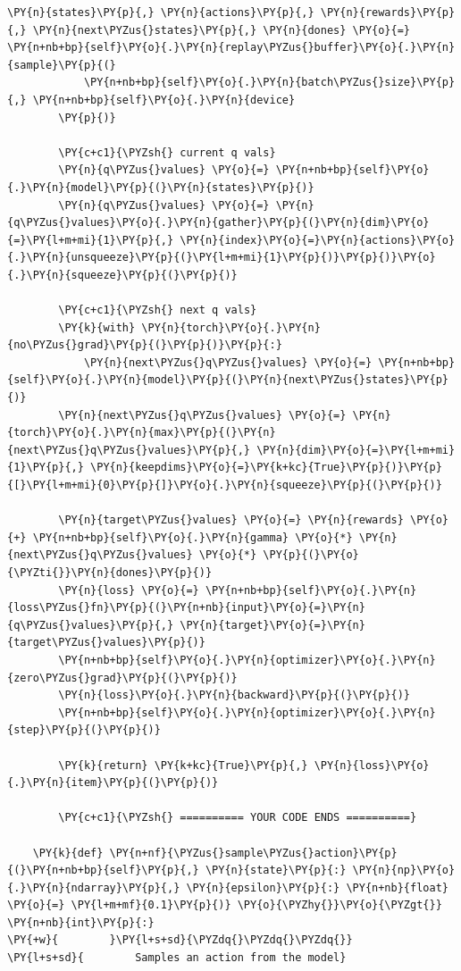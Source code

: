 \documentclass{article}
\begin{document}
\begin{Verbatim}[commandchars=\\\{\}]
        \PY{n}{states}\PY{p}{,} \PY{n}{actions}\PY{p}{,} \PY{n}{rewards}\PY{p}{,} \PY{n}{next\PYZus{}states}\PY{p}{,} \PY{n}{dones} \PY{o}{=} \PY{n+nb+bp}{self}\PY{o}{.}\PY{n}{replay\PYZus{}buffer}\PY{o}{.}\PY{n}{sample}\PY{p}{(}
            \PY{n+nb+bp}{self}\PY{o}{.}\PY{n}{batch\PYZus{}size}\PY{p}{,} \PY{n+nb+bp}{self}\PY{o}{.}\PY{n}{device}
        \PY{p}{)}

        \PY{c+c1}{\PYZsh{} current q vals}
        \PY{n}{q\PYZus{}values} \PY{o}{=} \PY{n+nb+bp}{self}\PY{o}{.}\PY{n}{model}\PY{p}{(}\PY{n}{states}\PY{p}{)}
        \PY{n}{q\PYZus{}values} \PY{o}{=} \PY{n}{q\PYZus{}values}\PY{o}{.}\PY{n}{gather}\PY{p}{(}\PY{n}{dim}\PY{o}{=}\PY{l+m+mi}{1}\PY{p}{,} \PY{n}{index}\PY{o}{=}\PY{n}{actions}\PY{o}{.}\PY{n}{unsqueeze}\PY{p}{(}\PY{l+m+mi}{1}\PY{p}{)}\PY{p}{)}\PY{o}{.}\PY{n}{squeeze}\PY{p}{(}\PY{p}{)}

        \PY{c+c1}{\PYZsh{} next q vals}
        \PY{k}{with} \PY{n}{torch}\PY{o}{.}\PY{n}{no\PYZus{}grad}\PY{p}{(}\PY{p}{)}\PY{p}{:}
            \PY{n}{next\PYZus{}q\PYZus{}values} \PY{o}{=} \PY{n+nb+bp}{self}\PY{o}{.}\PY{n}{model}\PY{p}{(}\PY{n}{next\PYZus{}states}\PY{p}{)}
        \PY{n}{next\PYZus{}q\PYZus{}values} \PY{o}{=} \PY{n}{torch}\PY{o}{.}\PY{n}{max}\PY{p}{(}\PY{n}{next\PYZus{}q\PYZus{}values}\PY{p}{,} \PY{n}{dim}\PY{o}{=}\PY{l+m+mi}{1}\PY{p}{,} \PY{n}{keepdims}\PY{o}{=}\PY{k+kc}{True}\PY{p}{)}\PY{p}{[}\PY{l+m+mi}{0}\PY{p}{]}\PY{o}{.}\PY{n}{squeeze}\PY{p}{(}\PY{p}{)}

        \PY{n}{target\PYZus{}values} \PY{o}{=} \PY{n}{rewards} \PY{o}{+} \PY{n+nb+bp}{self}\PY{o}{.}\PY{n}{gamma} \PY{o}{*} \PY{n}{next\PYZus{}q\PYZus{}values} \PY{o}{*} \PY{p}{(}\PY{o}{\PYZti{}}\PY{n}{dones}\PY{p}{)}
        \PY{n}{loss} \PY{o}{=} \PY{n+nb+bp}{self}\PY{o}{.}\PY{n}{loss\PYZus{}fn}\PY{p}{(}\PY{n+nb}{input}\PY{o}{=}\PY{n}{q\PYZus{}values}\PY{p}{,} \PY{n}{target}\PY{o}{=}\PY{n}{target\PYZus{}values}\PY{p}{)}
        \PY{n+nb+bp}{self}\PY{o}{.}\PY{n}{optimizer}\PY{o}{.}\PY{n}{zero\PYZus{}grad}\PY{p}{(}\PY{p}{)}
        \PY{n}{loss}\PY{o}{.}\PY{n}{backward}\PY{p}{(}\PY{p}{)}
        \PY{n+nb+bp}{self}\PY{o}{.}\PY{n}{optimizer}\PY{o}{.}\PY{n}{step}\PY{p}{(}\PY{p}{)}

        \PY{k}{return} \PY{k+kc}{True}\PY{p}{,} \PY{n}{loss}\PY{o}{.}\PY{n}{item}\PY{p}{(}\PY{p}{)}

        \PY{c+c1}{\PYZsh{} ========== YOUR CODE ENDS ==========}

    \PY{k}{def} \PY{n+nf}{\PYZus{}sample\PYZus{}action}\PY{p}{(}\PY{n+nb+bp}{self}\PY{p}{,} \PY{n}{state}\PY{p}{:} \PY{n}{np}\PY{o}{.}\PY{n}{ndarray}\PY{p}{,} \PY{n}{epsilon}\PY{p}{:} \PY{n+nb}{float} \PY{o}{=} \PY{l+m+mf}{0.1}\PY{p}{)} \PY{o}{\PYZhy{}}\PY{o}{\PYZgt{}} \PY{n+nb}{int}\PY{p}{:}
\PY{+w}{        }\PY{l+s+sd}{\PYZdq{}\PYZdq{}\PYZdq{}}
\PY{l+s+sd}{        Samples an action from the model}


\end{Verbatim}
\end{document}
